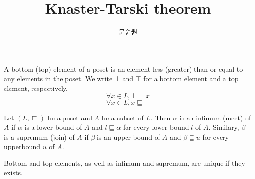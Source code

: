 \documentclass[9pt]{beamer}
\title{Knaster-Tarski theorem}
\author{문순원}
\begin{document}
\begin{frame}
  \titlepage
\end{frame}

\begin{frame}
  \begin{definition}
    A bottom (top) element of a poset is an element less (greater) than or equal to any elements in the poset.
    We write $\bot$ and $\top$ for a bottom element and a top element, respectively.
    $$
    \forall x \in L, \bot \sqsubseteq x
    $$
    $$
    \forall x \in L, x \sqsubseteq \top
    $$
  \end{definition}


  \begin{definition}
    Let $(L,\sqsubseteq)$ be a poset and $A$ be a subset of $L$.
    Then $\alpha$ is an infimum (meet) of $A$ if $\alpha$ is a lower bound of $A$
    and $l \sqsubseteq \alpha$ for every lower bound $l$ of $A$.
    Similary, $\beta$ is a supremum (join) of $A$ if $\beta$ is an upper bound of $A$
    and $\beta \sqsubseteq u$ for every upperbound $u$ of $A$.
  \end{definition}

  Bottom and top elements, as well as infimum and supremum, are unique if they exists.
\end{frame}
\end{document}
